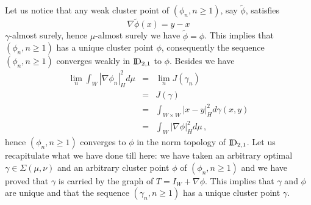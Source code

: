 \documentclass[12pt,a4paper]{book}
\newcommand{\beaa}{\begin{eqnarray*}}
\newcommand{\eeaa}{\end{eqnarray*}}
\newcommand{\DD}{{\rm I\!D}}
\newcommand{\ga}{\gamma}
\begin{document}
Let us notice
that any weak cluster point of $(\phi_n,n\geq 1)$, say $\tilde{\phi}$,
satisfies 
$$
\nabla\tilde{\phi}(x)=y-x
$$
$\ga$-almost surely, hence $\mu$-almost surely we have
$\tilde{\phi}=\phi$. This implies that $(\phi_n,n\geq 1)$ has a unique
cluster point $\phi$, consequently the sequence $(\phi_n,n\geq 1)$
converges weakly in $\DD_{2,1}$ to $\phi$. Besides we have
\beaa
\lim_n\int_W|\nabla\phi_n|_H^2d\mu&=&\lim_nJ(\ga_n)\\
&=&J(\ga)\\
&=&\int_{W\times W}|x-y|_H^2d\ga(x,y)\\
&=&\int_W|\nabla\phi|_H^2d\mu\,,
\eeaa
hence $(\phi_n,n\geq 1)$ converges to $\phi$ in the norm topology of
$\DD_{2,1}$.  Let us recapitulate what we
have done till here: we have taken an arbitrary optimal $\ga\in
\Sigma(\mu,\nu)$ and an arbitrary cluster point $\phi$ of
$(\phi_n,n\geq 1)$ and we have proved that $\ga$ is carried by the
graph of $T=I_W+\nabla\phi$. This implies that $\ga$ and $\phi$ are unique
and  that  the sequence $(\ga_n,n\geq 1)$ has a unique cluster point $\ga$.
\end{document}
